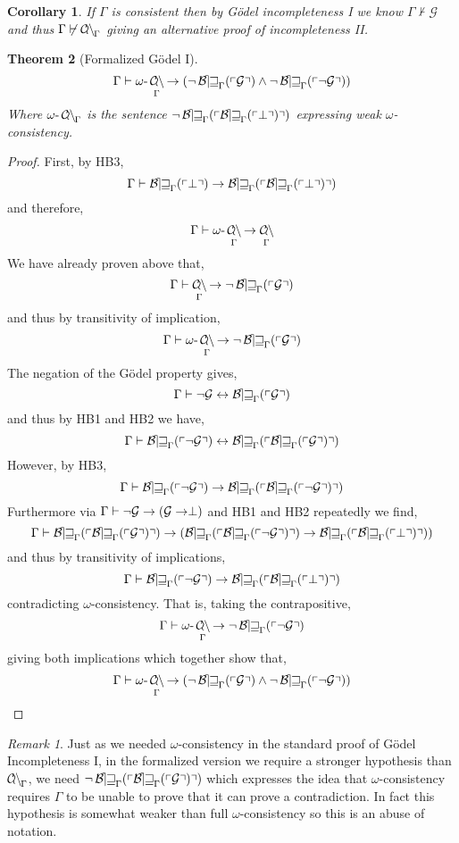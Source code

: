 \documentclass[12pt, leqno]{article}
\newcommand{\proves}{\vdash}
\theoremstyle{theorem}
\newtheorem{theorem}{Theorem}[section]
\newtheorem{corollary}[theorem]{Corollary}
\theoremstyle{definition}
\theoremstyle{definition}
\theoremstyle{remark}
\theoremstyle{definition}
\theoremstyle{remark}
\newtheorem{remark}{Remark}[subsection]
\DeclareMathOperator{\Con}{\mathcal{C\mkern-3mu o\mkern-1mu n\mkern-1.5mu}}
\begin{document}
\begin{corollary}
If $\Gamma$ is consistent then by G\"{o}del incompleteness I we know $\Gamma \not\proves \mathcal{G}$ and thus $\Gamma \not\proves \Con_{\Gamma}$ giving an alternative proof of incompleteness II. 
\end{corollary}

\newcommand{\oCon}{\omega\text{-}\Con_{\Gamma}}

\begin{theorem}[Formalized G\"{o}del I]
\[ \Gamma \proves \oCon \to (\neg \Thm{\G} \wedge \neg \Thm{\neg \G} ) \]
Where $\oCon$ is the sentence $\neg \operatorname{\mathcal{B\mkern-2.0mu e\mkern-2.0mu w\mkern-1mu}}_{\Gamma}(\left\ulcorner \operatorname{\mathcal{B\mkern-2.0mu e\mkern-2.0mu w\mkern-1mu}}_{\Gamma}(\left\ulcorner \perp \right\urcorner) \right\urcorner)$ expressing weak $\omega$-consistency. 
\end{theorem}

\begin{proof}
First, by HB3,
\[ \Gamma \proves \Thm{\perp} \to \Thm{\Thm{\perp}} \]
and therefore,
\[ \Gamma \proves \oCon \to \Con_{\Gamma} \]
We have already proven above that,
\[ \Gamma \proves \Con_{\Gamma} \to \neg \Thm{\G} \]
and thus by transitivity of implication,
\[ \Gamma \proves \oCon \to \neg \Thm{\G} \]
The negation of the G\"{o}del property gives,
\[ \Gamma \proves \neg \G \leftrightarrow \Thm{\G} \]
and thus by HB1 and HB2 we have,
\[ \Gamma \proves \Thm{\neg \G} \leftrightarrow \Thm{\Thm{\G}} \]
However, by HB3,
\[ \Gamma \proves \Thm{\neg \G} \to \Thm{\Thm{\neg \G}} \]
Furthermore via $\Gamma \proves \neg \G \to (\G \to \perp)$ and HB1 and HB2 repeatedly we find,
\[ \Gamma \proves \Thm{\Thm{\G}} \to (\Thm{\Thm{\neg \G}} \to \Thm{\Thm{\perp}}) \]
and thus by transitivity of implications,
\[ \Gamma \proves \Thm{\neg \G} \to \Thm{\Thm{\perp}} \]
contradicting $\omega$-consistency. That is, taking the contrapositive,
\[ \Gamma \proves \oCon \to \neg \Thm{\neg \G} \]
giving both implications which together show that,
\[ \Gamma \proves \oCon \to (\neg \Thm{\G} \wedge \neg \Thm{\neg \G}) \]
\end{proof}

\begin{remark}
Just as we needed $\omega$-consistency in the standard proof of G\"{o}del Incompleteness I, in the formalized version we require a stronger hypothesis than $\Con_{\Gamma}$, we need $\neg \operatorname{\mathcal{B\mkern-2.0mu e\mkern-2.0mu w\mkern-1mu}}_{\Gamma}(\left\ulcorner \operatorname{\mathcal{B\mkern-2.0mu e\mkern-2.0mu w\mkern-1mu}}_{\Gamma}(\left\ulcorner \mathcal{G} \right\urcorner) \right\urcorner)$ which expresses the idea that $\omega$-consistency requires $\Gamma$ to be unable to prove that it can prove a contradiction. In fact this hypothesis is somewhat weaker than full $\omega$-consistency so this is an abuse of notation. 
\end{remark}
\end{document}
